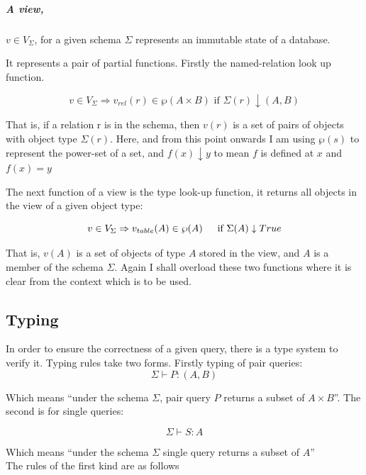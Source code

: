 \documentclass[12pt,a4paper,twoside,openright]{report}
\let\oldsubparagraph\subparagraph
\renewcommand{\subparagraph}[1]{\oldsubparagraph{#1}\mbox{}}
\begin{document}
\subparagraph{A view,} $v \in V_\Sigma$, for a given schema $\Sigma$ represents an immutable state of a database.

It represents a pair of partial functions. Firstly the named-relation look up function.

\begin{equation}
v \in V_\Sigma \Rightarrow v_{rel}(r) \in \wp(A \times B)\mbox{ if $\Sigma(r)\downarrow (A, B)$}
\end{equation} 

That is, if a relation r is in the schema, then $v(r)$ is a set of pairs of objects with object type $\Sigma(r)$. Here, and from this point onwards I am using $\wp(s)$ to represent the power-set of a set, and $f(x) \downarrow y$ to mean $f$ is defined at $x$ and $f(x)=y$


The next function of a view is the type look-up function, it returns all objects in the view of a given object type:

\begin{equation}
v \in V_\Sigma \Rightarrow v_{table}(A) \in \wp(A)\indent \mbox{if $\Sigma(A)\downarrow True$}
\end{equation} 

That is, $v(A)$ is a set of objects of type $A$ stored in the view, and $A$ is a member of the schema $\Sigma$. Again I shall overload these two functions where it is clear from the context which is to be used.
 
\subsection{Typing}
In order to ensure the correctness of a given query, there is a type system to verify it. Typing rules take two forms. Firstly typing of pair queries:
\[ \Sigma \vdash P\colon (A, B)\]

Which means ``under the schema $\Sigma$, pair query $P$ returns a subset of $A \times B$''.  The second is for single queries:

\[ \Sigma \vdash S \colon A \]

Which means ``under the schema $\Sigma$ single query returns a subset of $A$''\\

The rules of the first kind are as follows
\end{document}
